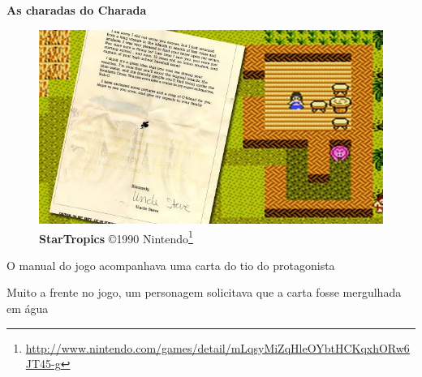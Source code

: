 \expandafter\documentclass\expandafter[table, usenames, svgnames, dvipsnames, \classopts]{beamer}
\begin{document}
\begin{frame}{\textbf{As charadas do Charada}}

	\begin{figure}
		\centering
		\includegraphics[draft,height=0.3\paperheight]{startropics}
		\caption{\tiny \textbf{StarTropics} \copyright{1990} Nintendo\footnote{\url{http://www.nintendo.com/games/detail/mLqsyMiZqHleOYbtHCKqxhORw6JT45-g}}}
	\end{figure}

	\vspace{-1em}

	\begin{outline}
		\1 O manual do jogo acompanhava uma carta do tio do protagonista
			
		\vspace{1em}
		
		\1 Muito a frente no jogo, um personagem solicitava que a carta fosse mergulhada em água
	\end{outline}

\end{frame}
\end{document}
